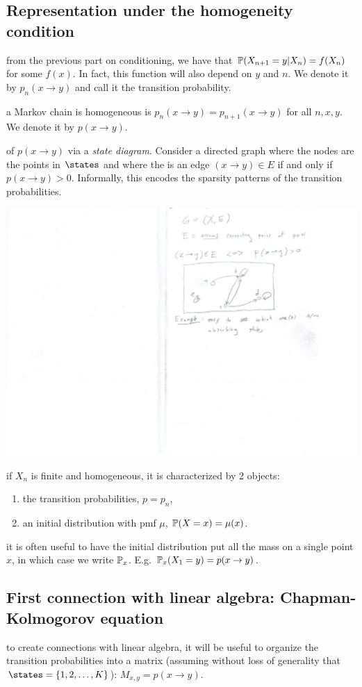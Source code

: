\documentclass{article}
\begin{document}
\subsection{Representation under the homogeneity condition}

 from the previous part on conditioning, we have that $\P(X_{n+1} = y | X_n) = f(X_n)$ for some $f(x)$. In fact, this function will also depend on $y$ and $n$. We denote it by $p_n(x \to y)$ and call it the transition probability.

 a Markov chain is homogeneous is $p_n(x \to y) = p_{n+1}(x \to y)$ for all $n, x, y$. We denote it by $p(x \to y)$. 

 of $p(x \to y)$ via a \emph{state diagram}. Consider a directed graph where the nodes are the points in $\states$ and where the is an edge $(x \to y) \in E$ if and only if $p(x \to y) > 0$. Informally, this encodes the sparsity patterns of the transition probabilities.
\begin{center}
	\includegraphics[width=0.3\linewidth]{figures/state-diagram} 
\end{center}

 if $X_n$ is finite and homogeneous, it is characterized by 2 objects:
\begin{enumerate}
  \item the transition probabilities, $p = p_n$,
  \item an initial distribution with pmf $\mu$, $\P(X = x) = \mu(x)$. 
\end{enumerate} 

 it is often useful to have the initial distribution put all the mass on a single point $x$, in which case we write $\P_x$. E.g. $\P_x(X_1 = y) = p(x \to y)$. 


\subsection{First connection with linear algebra: Chapman-Kolmogorov equation}

 to create connections with linear algebra, it will be useful to organize the transition probabilities into a matrix (assuming without loss of generality that $\states = \{1, 2, \dots, K\}$): $M_{x,y} = p(x \to y)$.
\end{document}
